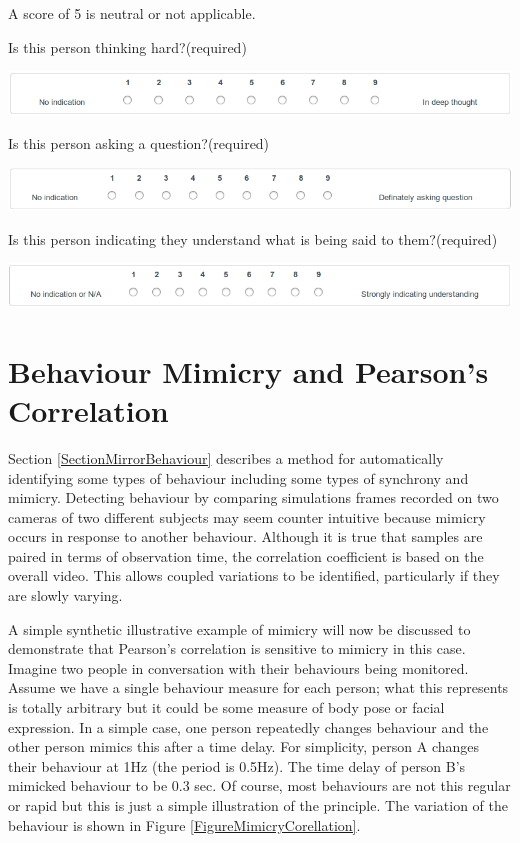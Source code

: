 \begin{appendices}
A score of 5 is neutral or not applicable.

Is this person thinking hard?(required)

\includegraphics[width = 0.9 \columnwidth]{corpus/questionthinking.png}

Is this person asking a question?(required)

\includegraphics[width = 0.9 \columnwidth]{corpus/questionquestion.png}

Is this person indicating they understand what is being said to them?(required)

\includegraphics[width = 0.9 \columnwidth]{corpus/questionunderstand.png}

\chapter{Behaviour Mimicry and Pearson's Correlation}
\label{ChapterMimicryColleration}

Section \ref{SectionMirrorBehaviour} describes a method for automatically identifying some types of behaviour including some types of synchrony and mimicry. Detecting behaviour by comparing simulations frames recorded on two cameras of two different subjects may seem counter intuitive because mimicry occurs in response to another behaviour. Although it is true that samples are paired in terms of observation time, the correlation coefficient is based on the overall video. This allows coupled variations to be identified, particularly if they are slowly varying.

A simple synthetic illustrative example of mimicry will now be discussed to demonstrate that Pearson's correlation is sensitive to mimicry in this case. Imagine two people in conversation with their behaviours being monitored. Assume we have a single behaviour measure for each person; what this represents is totally arbitrary but it could be some measure of body pose or facial expression. In a simple case, one person repeatedly changes behaviour and the other person mimics this after a time delay. For simplicity, person A changes their behaviour at 1Hz (the period is 0.5Hz). The time delay of person B's mimicked behaviour to be 0.3 sec. Of course, most behaviours are not this regular or rapid but this is just a simple illustration of the principle. The variation of the behaviour is shown in Figure \ref{FigureMimicryCorellation}.


\end{appendices}
